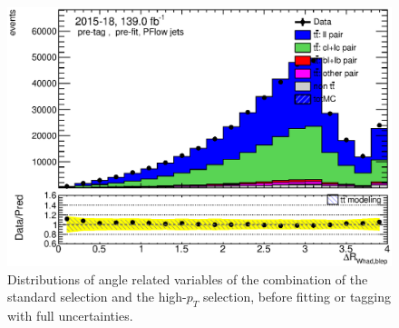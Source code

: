 \documentclass[letterpaper,12pt]{article}
\begin{document}
\begin{figure}
\begin{minipage}[b]{.45\textwidth}
	\includegraphics[width=1\textwidth]{Oct_distributions/pretagNoRwDL1rwithhighpTPFlow_scaledall/DataMC_dRWhadblep.eps} 
	\end{minipage}
	\caption{Distributions of angle related variables of the combination of the standard 
	selection and the high-$p_T$ selection, before fitting or 
	tagging with full uncertainties.} \label{fig:angles_PFlow}
	\end{figure}
	
\end{document}
